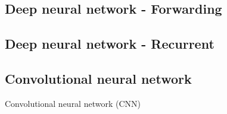 \subsection{Deep neural network - Forwarding}
\subsection{Deep neural network - Recurrent}
\subsection{Convolutional neural network}
Convolutional neural network (CNN)